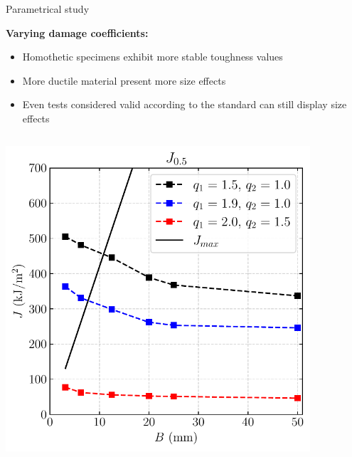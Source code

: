 \documentclass[9pt]{beamer}
\begin{document}

\begin{frame}{Parametrical study}

	\textcolor{MINESBlue}{\textbf{\large Varying damage coefficients:}}
	\vspace{0.2cm}
	\normalsize
	\begin{itemize}
		\item Homothetic specimens exhibit more stable toughness values
		\vspace{0.15cm}
		\item More ductile material present more size effects
		\vspace{0.15cm}
		\item Even tests considered valid according to the standard can still display size effects
	\end{itemize}
    \begin{columns}
        \centering
        \includegraphics[width=0.85\textwidth]{Images/plot_comp_homo_q1_q2.pdf}
        

\end{columns}
\end{frame}
\end{document}
